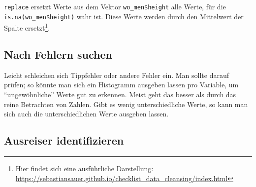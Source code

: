 \documentclass[12pt,]{book}
\newenvironment{Shaded}{\begin{snugshade}}{\end{snugshade}}
\newcommand{\KeywordTok}[1]{\textcolor[rgb]{0.13,0.29,0.53}{\textbf{{#1}}}}
\newcommand{\DataTypeTok}[1]{\textcolor[rgb]{0.13,0.29,0.53}{{#1}}}
\newcommand{\StringTok}[1]{\textcolor[rgb]{0.31,0.60,0.02}{{#1}}}
\newcommand{\CommentTok}[1]{\textcolor[rgb]{0.56,0.35,0.01}{\textit{{#1}}}}
\newcommand{\OtherTok}[1]{\textcolor[rgb]{0.56,0.35,0.01}{{#1}}}
\newcommand{\NormalTok}[1]{{#1}}
\let\rmarkdownfootnote\footnote%
\def\footnote{\protect\rmarkdownfootnote}
\begin{document}
\begin{Shaded}
\end{Shaded}

\texttt{replace} ersetzt Werte aus dem Vektor \texttt{wo\_men\$height}
alle Werte, für die \texttt{is.na(wo\_men\$height)} wahr ist. Diese
Werte werden durch den Mittelwert der Spalte ersetzt\footnote{Hier
  findet sich eine ausführliche Darstellung:
  \url{https://sebastiansauer.github.io/checklist_data_cleansing/index.html}}.

\subsection{Nach Fehlern suchen}\label{nach-fehlern-suchen}

Leicht schleichen sich Tippfehler oder andere Fehler ein. Man sollte
darauf prüfen; so könnte man sich ein Histogramm ausgeben lassen pro
Variable, um ``ungewöhnliche'' Werte gut zu erkennen. Meist geht das
besser als durch das reine Betrachten von Zahlen. Gibt es wenig
unterschiedliche Werte, so kann man sich auch die unterschiedlichen
Werte ausgeben lassen.

\begin{Shaded}
\end{Shaded}

\subsection{Ausreiser identifizieren}\label{ausreiser-identifizieren}
\end{document}
